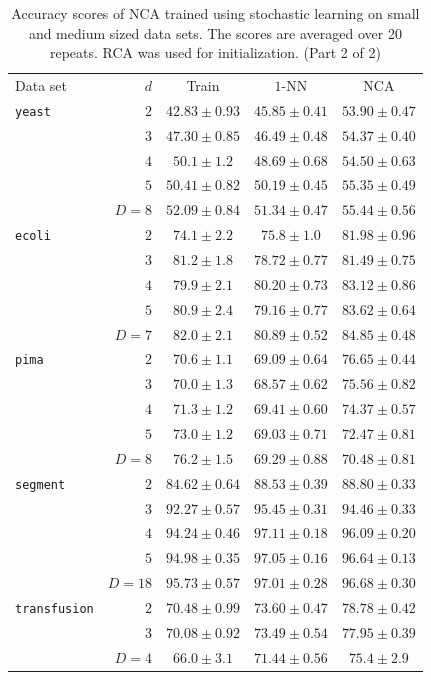 \begin{table}
  \centering\begin{tabular}{lrccc}
  \toprule
   Data set & $d$ & Train & $1$-NN & NCA \\
    \cmidrule(r){3-3}\cmidrule(r){4-5}
    \texttt{yeast}&$2$&$42.83 \pm 0.93$&$45.85 \pm 0.41$&$53.90 \pm 0.47$\\ 
    &$3$&$47.30 \pm 0.85$&$46.49 \pm 0.48$&$54.37 \pm 0.40$\\ 
    &$4$&$50.1 \pm 1.2$&$48.69 \pm 0.68$&$54.50 \pm 0.63$\\ 
    &$5$&$50.41 \pm 0.82$&$50.19 \pm 0.45$&$55.35 \pm 0.49$\\ 
    &$D=8$&$52.09 \pm 0.84$&$51.34 \pm 0.47$&$55.44 \pm 0.56$\\ 
    \midrule
    \texttt{ecoli}&$2$&$74.1 \pm 2.2$&$75.8 \pm 1.0$&$81.98 \pm 0.96$\\ 
    &$3$&$81.2 \pm 1.8$&$78.72 \pm 0.77$&$81.49 \pm 0.75$\\ 
    &$4$&$79.9 \pm 2.1$&$80.20 \pm 0.73$&$83.12 \pm 0.86$\\ 
    &$5$&$80.9 \pm 2.4$&$79.16 \pm 0.77$&$83.62 \pm 0.64$\\ 
    &$D=7$&$82.0 \pm 2.1$&$80.89 \pm 0.52$&$84.85 \pm 0.48$\\ 
    \midrule
    \texttt{pima}&$2$&$70.6 \pm 1.1$&$69.09 \pm 0.64$&$76.65 \pm 0.44$\\ 
    &$3$&$70.0 \pm 1.3$&$68.57 \pm 0.62$&$75.56 \pm 0.82$\\ 
    &$4$&$71.3 \pm 1.2$&$69.41 \pm 0.60$&$74.37 \pm 0.57$\\ 
    &$5$&$73.0 \pm 1.2$&$69.03 \pm 0.71$&$72.47 \pm 0.81$\\ 
    &$D=8$&$76.2 \pm 1.5$&$69.29 \pm 0.88$&$70.48 \pm 0.81$\\ 
    \midrule
    \texttt{segment}&$2$&$84.62 \pm 0.64$&$88.53 \pm 0.39$&$88.80 \pm 0.33$\\ 
    &$3$&$92.27 \pm 0.57$&$95.45 \pm 0.31$&$94.46 \pm 0.33$\\ 
    &$4$&$94.24 \pm 0.46$&$97.11 \pm 0.18$&$96.09 \pm 0.20$\\ 
    &$5$&$94.98 \pm 0.35$&$97.05 \pm 0.16$&$96.64 \pm 0.13$\\ 
    &$D=18$&$95.73 \pm 0.57$&$97.01 \pm 0.28$&$96.68 \pm 0.30$\\ 
    \midrule
    \texttt{transfusion}&$2$&$70.48 \pm 0.99$&$73.60 \pm 0.47$&$78.78 \pm 0.42$\\ 
    &$3$&$70.08 \pm 0.92$&$73.49 \pm 0.54$&$77.95 \pm 0.39$\\ 
    &$D=4$&$66.0 \pm 3.1$&$71.44 \pm 0.56$&$75.4 \pm 2.9$\\ 
    \bottomrule
   \end{tabular}
        \caption[Accuracy for NCA trained using stochastic learning on small and medium sized data sets (part 2 of 2)]{Accuracy scores of NCA trained using stochastic learning on small and medium sized data sets. The scores are averaged over 20 repeats. RCA was used for initialization. (Part 2 of 2)}
        \label{app:table:nca-sl-small-2}
\end{table}


